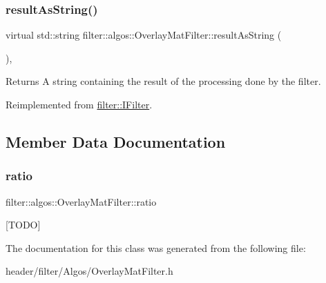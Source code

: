 \subsubsection{\texorpdfstring{result\+As\+String()}{resultAsString()}}
{\footnotesize\ttfamily virtual std\+::string filter\+::algos\+::\+Overlay\+Mat\+Filter\+::result\+As\+String (\begin{DoxyParamCaption}{ }\end{DoxyParamCaption})\hspace{0.3cm}{\ttfamily [inline]}, {\ttfamily [virtual]}}

\begin{DoxyReturn}{Returns}
A string containing the result of the processing done by the filter. 
\end{DoxyReturn}


Reimplemented from \hyperlink{classfilter_1_1_i_filter_ab99902b060a6d9edc3452a8c9f85e37e}{filter\+::\+I\+Filter}.



\subsection{Member Data Documentation}
\mbox{\label{classfilter_1_1algos_1_1_overlay_mat_filter_a02c07505d1ec765f1e7565f03f508d1f}} 
\subsubsection{\texorpdfstring{ratio}{ratio}}
{\footnotesize\ttfamily filter\+::algos\+::\+Overlay\+Mat\+Filter\+::ratio}

\mbox{[}T\+O\+DO\mbox{]} 

The documentation for this class was generated from the following file\+:\begin{DoxyCompactItemize}
\item 
header/filter/\+Algos/Overlay\+Mat\+Filter.\+h\end{DoxyCompactItemize}
